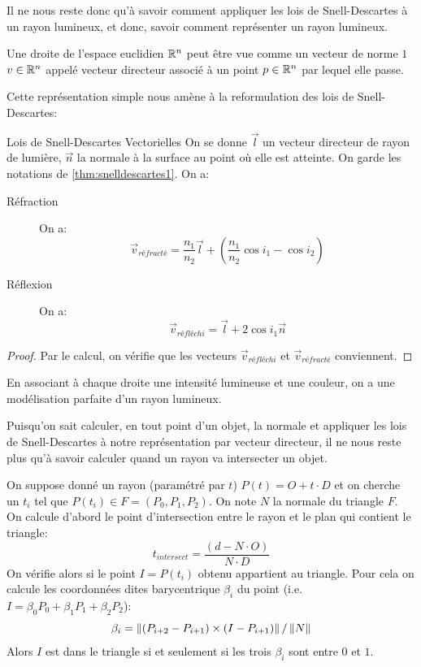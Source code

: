 \documentclass{classe}
\begin{document}
Il ne nous reste donc qu'à savoir comment appliquer les lois de Snell-Descartes à un rayon lumineux, et donc, savoir comment représenter un rayon lumineux.
\begin{propositionfr}{}{}
	Une droite de l'espace euclidien $\mathbb{R}^{n}$ peut être vue comme un vecteur de norme $1$ $v \in \mathbb{R}^{n}$ appelé vecteur directeur associé à un point $p \in \mathbb{R}^{n}$ par lequel elle passe.
\end{propositionfr}
Cette représentation simple nous amène à la reformulation des lois de Snell-Descartes:
\begin{propositionfr}{Lois de Snell-Descartes Vectorielles}
	On se donne $\overrightarrow{l}$ un vecteur directeur de rayon de lumière, $\vec{n}$ la normale à la surface au point où elle est atteinte.
	On garde les notations de \ref{thm:snelldescartes1}.
	On a:
	\begin{description}
		\item[Réfraction] On a:
			\begin{equation}
				\vec{v}_{réfracté} = \frac{n_{1}}{n_{2}}\vec{l} + \left(\frac{n_{1}}{n_{2}}\cos i_{1} - \cos i_{2}\right)
				\label{snelldescartesrefraction}
			\end{equation}
		\item[Réflexion] On a:
			\begin{equation}
				\vec{v}_{réfléchi} = \vec{l} + 2\cos i_{1}\vec{n}
				\label{snelldescartesreflexion}
			\end{equation}
	\end{description}
\end{propositionfr}
\begin{proof}
	Par le calcul, on vérifie que les vecteurs $\vec{v}_{réfléchi}$ et $\vec{v}_{réfracté}$ conviennent.
\end{proof}
En associant à chaque droite une intensité lumineuse et une couleur, on a une modélisation parfaite d'un rayon lumineux.

Puisqu'on sait calculer, en tout point d'un objet, la normale et appliquer les lois de Snell-Descartes à notre représentation par vecteur directeur, il ne nous reste plus qu'à savoir calculer quand un rayon va intersecter un objet.

On suppose donné un rayon (paramétré par $t$) $P(t) = O+ t\cdot D$ et on cherche un $t_{i}$ tel que $P(t_{i}) \in F = (P_{0}, P_{1}, P_{2})$.
On note $N$ la normale du triangle $F$.
On calcule d'abord le point d'intersection entre le rayon et le plan qui contient le triangle:
\begin{equation*}
	t_{intersect} = \frac{\left(d - N\cdot O\right)}{N \cdot D}
\end{equation*}
On vérifie alors si le point $I = P(t_{i})$ obtenu appartient au triangle. Pour cela on calcule les coordonnées dites barycentrique $\beta_{i}$ du point (i.e. $I = \beta_{0}P_{0} + \beta_{1}P_{1} + \beta_{2}P_{2}$):
\begin{equation*}
	\beta_{i} = \left\lVert \left(P_{i + 2} - P_{i + 1}\right) \times \left(I - P_{i + 1}\right) \right\rVert/\left\lVert N \right\rVert
\end{equation*}
Alors $I$ est dans le triangle si et seulement si les trois $\beta_{i}$ sont entre $0$ et $1$.
\end{document}
